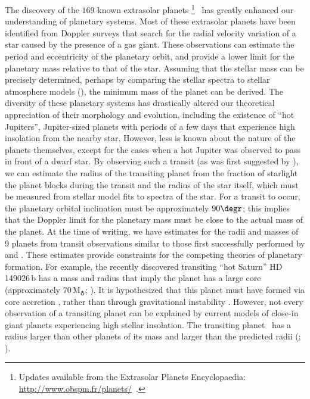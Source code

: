 The discovery of the $169$ known extrasolar planets%
\footnote{Updates available from the
Extrasolar Planets Encyclopaedia:\\
\url{http://www.obspm.fr/planets/}\ .}%
\ has greatly enhanced our
understanding of planetary systems. Most of these extrasolar planets
have been identified from Doppler surveys that search for the radial
velocity variation of a star caused by the presence of a gas giant.
These observations can estimate the period and eccentricity of the
planetary orbit, and provide a lower limit for the planetary mass
relative to that of the star. Assuming that the stellar mass can be
precisely determined, perhaps by comparing the stellar spectra to
stellar atmosphere models (\citealp[such as][]{Kurucz:ATLAS9:1993a}),
the minimum mass of the planet can be derived.  The diversity of these
planetary systems has drastically altered our theoretical appreciation
of their morphology and evolution, including the existence of ``hot
Jupiters'', Jupiter-sized planets with periods of a few days that
experience high insolation from the nearby star.  However, less is
known about the nature of the planets themselves, except for the cases
when a hot Jupiter was observed to pass in front of a dwarf star. By
observing such a transit (as was first suggested by
\citealt{Struve:obs:1952a}), we can estimate the radius of the
transiting planet from the fraction of starlight the planet blocks
during the transit and the radius of the star itself, which must be
measured from stellar model fits to spectra of the star. For a transit
to occur, the planetary orbital inclination must be approximately
$90\degr$; this implies that the Doppler limit for the planetary
mass must be close to the actual mass of the planet. At the
time of writing, we have estimates for the radii and masses of 9 planets from transit
observations similar to those first successfully performed by
\citet{Charbonneau_Brown_Latham:apjl:2000a} and
\citet{Henry_Marcy_Butler:apj:2000a}. These estimates provide
constraints for the competing theories of planetary formation. For
example, the recently discovered transiting ``hot Saturn''
\mbox{HD\,149026\,b} has a mass and radius that imply the
planet has a large core (approximately $70\,\mathrm{M}_{\earth}$;
\citealt{Sato_Fischer_Henry:apj:2005a, Charbonneau_Winn_Latham:apj:2006a}).
It is hypothesized that this planet must have formed via core
accretion \citep{Pollack:araa:1984a, Pollack_Hubickyj_Bodenheimer:icarus:1996a},
rather than through gravitational instability \citep{Boss:sc:1997a}.
However, not every observation of a transiting planet can be explained
by current models of close-in giant planets experiencing high stellar
insolation. The transiting planet \hdTZNb\ has a radius larger than
other planets of its mass and larger than the predicted radii
(\citealp[see][ and references
therein]{Laughlin_Wolf_Vanmunster:apj:2005a};
\citealt{Deming_Seager_Richardson:nat:2005a}).

